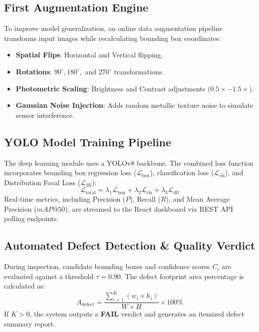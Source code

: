 \documentclass[conference]{IEEEtran}
\begin{document}
\subsection{First Augmentation Engine}
To improve model generalization, an online data augmentation pipeline transforms input images while recalculating bounding box coordinates:
\begin{itemize}
    \item \textbf{Spatial Flips}: Horizontal and Vertical flipping.
    \item \textbf{Rotations}: $90^\circ, 180^\circ,$ and $270^\circ$ transformations.
    \item \textbf{Photometric Scaling}: Brightness and Contrast adjustments ($0.5\times - 1.5\times$).
    \item \textbf{Gaussian Noise Injection}: Adds random metallic texture noise to simulate sensor interference.
\end{itemize}

\subsection{YOLO Model Training Pipeline}
The deep learning module uses a YOLOv8 backbone. The combined loss function incorporates bounding box regression loss ($\mathcal{L}_{\text{box}}$), classification loss ($\mathcal{L}_{\text{cls}}$), and Distribution Focal Loss ($\mathcal{L}_{\text{dfl}}$):
\begin{equation}
\mathcal{L}_{\text{total}} = \lambda_1 \mathcal{L}_{\text{box}} + \lambda_2 \mathcal{L}_{\text{cls}} + \lambda_3 \mathcal{L}_{\text{dfl}}
\end{equation}
Real-time metrics, including Precision ($P$), Recall ($R$), and Mean Average Precision ($mAP@50$), are streamed to the React dashboard via REST API polling endpoints.

\subsection{Automated Defect Detection & Quality Verdict}
During inspection, candidate bounding boxes and confidence scores $C_i$ are evaluated against a threshold $\tau = 0.90$. The defect footprint area percentage is calculated as:
\begin{equation}
A_{\text{defect}} = \frac{\sum_{i=1}^{K} (w_i \times h_i)}{W \times H} \times 100\%
\end{equation}
If $K > 0$, the system outputs a \textbf{FAIL} verdict and generates an itemized defect summary report.
\end{document}
